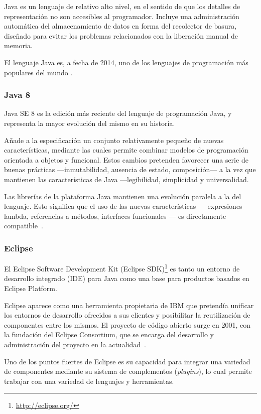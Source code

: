Java es un lenguaje de relativo alto nivel, en el sentido de que los detalles de representación no son accesibles al programador.
Incluye una administración automática del almacenamiento de datos en forma del recolector de basura, diseñado para evitar los problemas relacionados con la liberación manual de memoria.

El lenguaje Java es, a fecha de 2014, uno de los lenguajes de programación más populares del mundo \cite{website:tiobe}.

\subsubsection{Java 8}
Java SE 8 es la edición más reciente del lenguaje de programación Java, y representa la mayor evolución del mismo en su historia.

Añade a la especificación un conjunto relativamente pequeño de nuevas características, mediante las cuales permite combinar modelos de programación orientada a objetos y funcional.
Estos cambios pretenden favorecer una serie de buenas prácticas ---inmutabilidad, ausencia de estado, composición--- a la vez que mantienen las características de Java ---legibilidad, simplicidad y universalidad.

Las librerías de la plataforma Java mantienen una evolución paralela a la del lenguaje.
Esto significa que el uso de las nuevas características --- expresiones lambda, referencias a métodos, interfaces funcionales --- es directamente compatible~\cite{jls8}.

\subsubsection{Eclipse}
El Eclipse Software Development Kit (Eclipse SDK)\footnote{\url{http://eclipse.org/}} es tanto un entorno de desarrollo integrado (IDE) para Java como una base para productos basados en Eclipse Platform.

Eclipse aparece como una herramienta propietaria de IBM que pretendía unificar los entornos de desarrollo ofrecidos a sus clientes y posibilitar la reutilización de componentes entre los mismos.
El proyecto de código abierto surge en 2001, con la fundación del Eclipse Consortium, que se encarga del desarrollo y administración del proyecto en la actualidad~\cite{website:eclipseFAQ}.

Uno de los puntos fuertes de Eclipse es su capacidad para integrar una variedad de componentes mediante su sistema de complementos (\emph{plugins}), lo cual permite trabajar con una variedad de lenguajes y herramientas.

